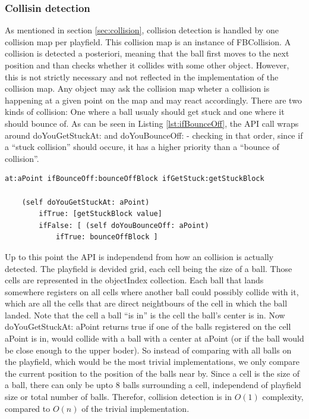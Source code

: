 \subsubsection{Collisin detection}
As mentioned in section
\ref{sec:collision}, 
collision detection is handled by one collision map per playfield. This collision
map is an instance of FBCollision. A collision is detected a posteriori, meaning
that the ball first moves to the next position and  than checks whether it collides
with some other object. However, this is not strictly necessary and not reflected in
the implementation of the collision map. Any object may ask the collision map wheter
a collision is happening at a given point on the map and may react accordingly. There
are two kinds of collision: One where a ball usualy should get stuck and one where it
should bounce of. As can be seen in Listing \ref{lst:ifBounceOff}, the API call wraps
around doYouGetStuckAt: and doYouBounceOff: - checking in that order, since if a ``stuck
collision'' should occure, it has a higher priority than a ``bounce of collision''.
%
\begin{lstlisting}[caption=API method for detecting collision,label=lst:ifBounceOff]
at:aPoint ifBounceOff:bounceOffBlock ifGetStuck:getStuckBlock
	
	(self doYouGetStuckAt: aPoint)
		ifTrue: [getStuckBlock value]
		ifFalse: [ (self doYouBounceOff: aPoint)
			ifTrue: bounceOffBlock ]
\end{lstlisting}
%
Up to this point the API is independend from how an collision is actually detected.
The playfield is devided grid, each cell being the size of a ball. Those cells are represented
in the objectIndex collection. Each ball that lands somewhere registers on all cells where
another ball could possibly collide with it, which are all the cells that are direct neightbours
of the cell in which the ball landed. Note that the cell a ball ``is in'' is the cell the ball's
center is in. Now doYouGetStuckAt: aPoint returns true if one of the balls registered on the
cell aPoint is in, would collide with a ball with a center at aPoint (or if the ball would be
close enough to the upper boder). So instead of comparing with all balls on the playfield, which
would be the most trivial implementations, we only compare the current position to the position
of the balls near by. Since a cell is the size of a ball, there can only be upto 8 balls surrounding
a cell, independend of playfield size or total number of balls. Therefor, collision detection is in
$O(1)$ complexity, compared to $O(n)$ of the trivial implementation.


